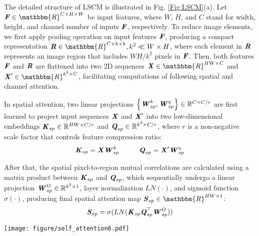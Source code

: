 \documentclass[lettersize,journal]{IEEEtran}
\begin{document}
The detailed structure of LSCM is illustrated in Fig. \ref{Fig:LSCM}(a). Let $\textbf{\emph{F}}\in\mathbbm{R}^{C \times H \times W}$ be input features, where $W$, $H$, and $C$ stand for width, height, and channel number of inputs $\textbf{\emph{F}}$, respectively. To reduce image elements, we first apply pooling operation on input features $\textbf{\emph{F}}$, producing a compact representation $\textbf{\emph{R}}\in\mathbbm{R}^{C \times k \times k}, k^2 \ll W \times H$, where each element in $\textbf{\emph{R}}$ represents an image region that includes $WH/{k^2}$ pixels in $\textbf{\emph{F}}$. Then, both features $\textbf{\emph{F}}$ and $\textbf{\emph{R}}$ are flattened into two 2D sequences $\textbf{\emph{X}}\in\mathbbm{R}^{HW \times C}$ and $\textbf{\emph{X}}^{\prime}\in\mathbbm{R}^{k^{2} \times C}$, facilitating computations of following spatial and channel attention.




In spatial attention, two linear projections $\left\{\textbf{\emph{W}}_{sp}^k, \textbf{\emph{W}}_{sp}^q\right\}\in\mathbb{R}^{C \times C/r}$ are first learned to project input sequences $\textbf{\emph{X}}$ and $\textbf{\emph{X}}^{\prime}$ into two low-dimensional embeddings $\textbf{\emph{K}}_{sp}\in\mathbb{R}^{HW \times C/r}$ and $\textbf{\emph{Q}}_{sp}\in\mathbb{R}^{k^2 \times C/r}$, where $r$ is a non-negative scale factor that controls feature compression ratio:
\begin{equation}
    \textbf{\emph{K}}_{sp} = \textbf{\emph{X}}\textbf{\emph{W}}_{sp}^k \hspace{1cm} \textbf{\emph{Q}}_{sp}= \textbf{\emph{X}}^{\prime} \textbf{\emph{W}}_{sp}^q
\end{equation}


\noindent After that, the spatial pixel-to-region mutual correlations are calculated using a matrix product between $\textbf{\emph{K}}_{sp}$ and $\textbf{\emph{Q}}_{sp}$, which sequentially undergo a linear projection $\textbf{\emph{W}}_{sp}^O\in\mathbb{R}^{k^{2} \times 1}$, layer normalization $LN(\cdot)$, and sigmoid function $\sigma(\cdot)$, producing final spatial attention map $\textbf{\emph{S}}_{sp}\in\mathbbm{R}^{HW \times 1}$:
\begin{equation}
    \textbf{\emph{S}}_{sp}  = \sigma(LN(\textbf{\emph{K}}_{sp} \textbf{\emph{Q}}_{sp}^{\top}\textbf{\emph{W}}_{sp}^O))
\end{equation}

\begin{figure*}[t!] 
\centering 
\texttt{[image: figure/self\_attention6.pdf]} 
\caption{Overview of the lightweight attention employed in backbone and neck. (a) LSCM; (b) LCCM-TD, and (c) LCCM-BU. (Best viewed in color)} 
\label{Fig:LSCM} 
\end{figure*}
\end{document}

